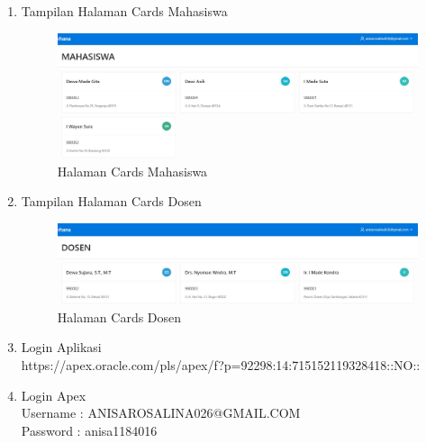 \begin{enumerate}
\begin{figure}[!htbp]
    \end{figure} 
\item Tampilan Halaman Cards Mahasiswa
    \begin{figure}[!htbp]
    \begin{center}
    \includegraphics[scale=0.4]{section/ica68.JPG}
    \caption{Halaman Cards Mahasiswa}
    \end{center}   
    \end{figure} 
\item Tampilan Halaman Cards Dosen
    \begin{figure}[!htbp]
    \begin{center}
    \includegraphics[scale=0.4]{section/ica69.JPG}
    \caption{Halaman Cards Dosen}
    \end{center}   
    \end{figure} 
\item Login Aplikasi  \\ https://apex.oracle.com/pls/apex/f?p=92298:14:715152119328418::NO::
\item Login Apex  \\    
Username        : ANISAROSALINA026@GMAIL.COM \\ Password        : anisa1184016
\end{enumerate}

